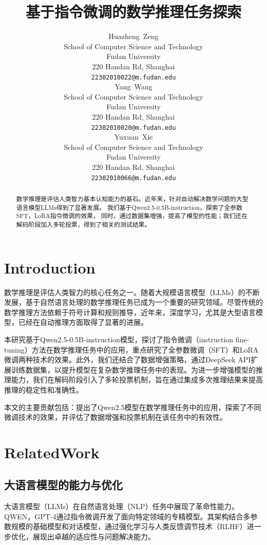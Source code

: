 \documentclass{article}
\title{基于指令微调的数学推理任务探索}
\author{
    Huazheng~Zeng\\
    School of Computer Science and Technology \\
    Fudan University \\
    220 Handan Rd, Shanghai \\
    \texttt{22302010022@m.fudan.edu} \\
    \AND
    Yang~Wang\\
    School of Computer Science and Technology \\
    Fudan University \\
    220 Handan Rd, Shanghai \\
    \texttt{22302010020@m.fudan.edu} \\
    \AND
    Yuxuan~Xie\\
    School of Computer Science and Technology \\
    Fudan University \\
    220 Handan Rd, Shanghai \\
    \texttt{22302010066@m.fudan.edu} \\
}
\begin{document}
\maketitle


\begin{abstract}
  数学推理是评估人类智力基本认知能力的基石。近年来，针对自动解决数学问题的大型语言模型LLMs得到了显著发展。
  我们基于Qwen2.5-0.5B-instruction，探索了全参数SFT，LoRA指令微调的效果，
  同时，通过数据集增强，提高了模型的性能；我们还在解码阶段加入多轮投票，得到了相关的测试结果。
\end{abstract}



\section{Introduction}

数学推理是评估人类智力的核心任务之一。随着大规模语言模型（LLMs）的不断发展，基于自然语言处理的数学推理任务已成为一个重要的研究领域。尽管传统的数学推理方法依赖于符号计算和规则推导，近年来，深度学习，尤其是大型语言模型，已经在自动推理方面取得了显著的进展。

本研究基于Qwen2.5-0.5B-instruction模型，探讨了指令微调（instruction fine-tuning）方法在数学推理任务中的应用，重点研究了全参数微调（SFT）和LoRA微调两种技术的效果。此外，我们还结合了数据增强策略，通过DeepSeek API扩展训练数据集，以提升模型在复杂数学推理任务中的表现。为进一步增强模型的推理能力，我们在解码阶段引入了多轮投票机制，旨在通过集成多次推理结果来提高推理的稳定性和准确性。

本文的主要贡献包括：提出了Qwen2.5模型在数学推理任务中的应用，探索了不同微调技术的效果，并评估了数据增强和投票机制在该任务中的有效性。







\section{RelatedWork}

\subsection{大语言模型的能力与优化}
大语言模型（LLMs）在自然语言处理（NLP）任务中展现了革命性能力。QWEN\cite{bai2023qwentech}，GPT-4通过指令微调开发了面向特定领域的专精模型。其架构结合多参数规模的基础模型和对话模型，通过强化学习与人类反馈调节技术（RLHF）进一步优化，展现出卓越的适应性与问题解决能力\cite{bai2023qwentech}\cite{openai2024gpt4}。
\end{document}
